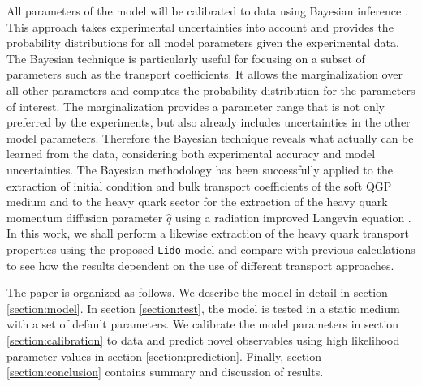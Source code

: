 \documentclass[aps, prc, reprint, amsmath, groupedaddress, nofootinbib]{revtex4-1}
\begin{document}
All parameters of the model will be calibrated to data using Bayesian inference \cite{Novak:2013bqa,Bernhard:2015hxa}.
This approach takes experimental uncertainties into account and provides the probability distributions for all model parameters given the experimental data.
The Bayesian technique is particularly useful for focusing on a subset of parameters such as the transport coefficients.
It allows the marginalization over all other parameters and computes the probability distribution for the parameters of interest. 
The marginalization provides a parameter range that is not only preferred by the experiments, but also already includes uncertainties in the other model parameters.
Therefore the Bayesian technique reveals what actually can be learned from the data, considering both experimental accuracy and model uncertainties.
The Bayesian methodology has been successfully applied to the extraction of initial condition and bulk transport coefficients of the soft QGP medium \cite{Novak:2013bqa, Pratt:2015zsa, Bernhard:2015hxa, Bernhard:2016tnd, Auvinen:2017fjw} and to the heavy quark sector for the extraction of the heavy quark momentum diffusion parameter $\hat{q}$ using a radiation improved Langevin equation \cite{Xu:2017obm, Cao:2013ita}.
In this work, we shall perform a likewise extraction of the heavy quark transport properties using the proposed {\tt Lido} model and compare with previous calculations to see how the results dependent on the use of different transport approaches.

The paper is organized as follows. 
We describe the model in detail in section \ref{section:model}. In section \ref{section:test}, the model is tested in a static medium with a set of default parameters. 
We calibrate the model parameters in section \ref{section:calibration} to data and predict novel observables using high likelihood parameter values in section \ref{section:prediction}. 
Finally, section \ref{section:conclusion} contains summary and discussion of results.
\end{document}
